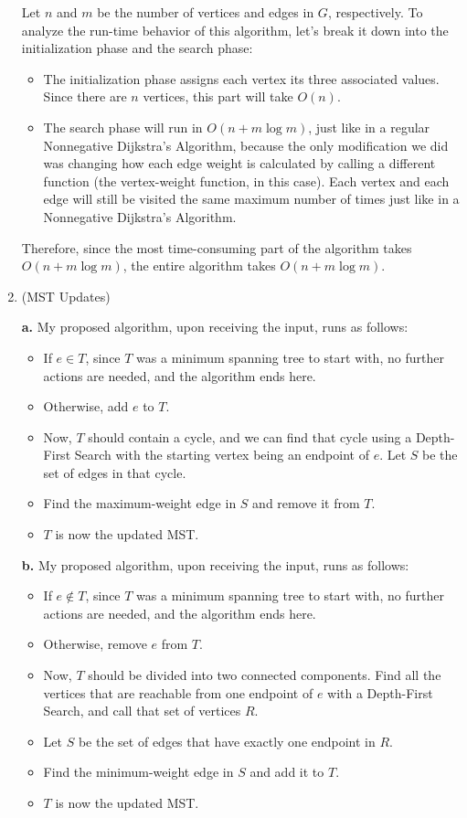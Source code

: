 \documentclass{article}
\begin{document}
\begin{enumerate}
    Let $n$ and $m$ be the number of vertices and edges in $G$, respectively. To analyze the run-time behavior of this algorithm, let's break it down into the initialization phase and the search phase:
    \begin{itemize}
      \item The initialization phase assigns each vertex its three associated values. Since there are $n$ vertices, this part will take $O(n)$.
      \item The search phase will run in $O(n + m\log m)$, just like in a regular Nonnegative Dijkstra's Algorithm, because the only modification we did was changing how each edge weight is calculated by calling a different function (the vertex-weight function, in this case). Each vertex and each edge will still be visited the same maximum number of times just like in a Nonnegative Dijkstra's Algorithm.
    \end{itemize}

    Therefore, since the most time-consuming part of the algorithm takes $O(n + m\log m)$, the entire algorithm takes $O(n + m\log m)$.

    \pagebreak

  \item (MST Updates)

    \textbf{a.} My proposed algorithm, upon receiving the input, runs as follows:
    \begin{itemize}
      \item If $e \in T$, since $T$ was a minimum spanning tree to start with, no further actions are needed, and the algorithm ends here.
      \item Otherwise, add $e$ to $T$.
      \item Now, $T$ should contain a cycle, and we can find that cycle using a Depth-First Search with the starting vertex being an endpoint of $e$. Let $S$ be the set of edges in that cycle.
      \item Find the maximum-weight edge in $S$ and remove it from $T$.
      \item $T$ is now the updated MST.
    \end{itemize}

    \textbf{b.} My proposed algorithm, upon receiving the input, runs as follows:
    \begin{itemize}
      \item If $e \notin T$, since $T$ was a minimum spanning tree to start with, no further actions are needed, and the algorithm ends here.
      \item Otherwise, remove $e$ from $T$.
      \item Now, $T$ should be divided into two connected components. Find all the vertices that are reachable from one endpoint of $e$ with a Depth-First Search, and call that set of vertices $R$.
      \item Let $S$ be the set of edges that have exactly one endpoint in $R$.
      \item Find the minimum-weight edge in $S$ and add it to $T$.
      \item $T$ is now the updated MST.
    \end{itemize}

\end{enumerate}
\end{document}
